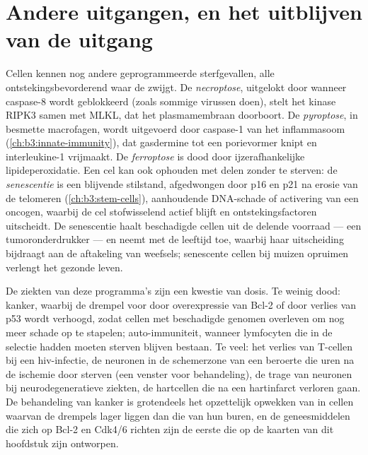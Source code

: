 \section{Andere uitgangen, en het uitblijven van de uitgang}

\begin{definition}\label{def:b3:cell-cycle-apoptosis:other}
Cellen kennen nog andere geprogrammeerde sterfgevallen, alle
ontstekingsbevorderend waar de  zwijgt. De \emph{necroptose},
uitgelokt door  wanneer caspase-8 wordt geblokkeerd
(zoals sommige virussen doen), stelt het kinase RIPK3 samen met MLKL,
dat het plasmamembraan doorboort. De \emph{pyroptose}, in besmette
macrofagen, wordt uitgevoerd door caspase-1 van het inflammasoom
(\cref{ch:b3:innate-immunity}), dat gasdermine tot een porievormer
knipt en interleukine-1 vrijmaakt. De \emph{ferroptose} is dood door
ijzerafhankelijke lipideperoxidatie. Een cel kan ook ophouden met delen
zonder te sterven: de \emph{senescentie} is een blijvende stilstand,
afgedwongen door p16 en p21 na erosie van de telomeren
(\cref{ch:b3:stem-cells}), aanhoudende DNA-schade of activering van een
oncogen, waarbij de cel stofwisselend actief blijft en
ontstekingsfactoren uitscheidt. De senescentie haalt beschadigde
cellen uit de delende voorraad --- een tumoronderdrukker --- en neemt
met de leeftijd toe, waarbij haar uitscheiding bijdraagt aan de
aftakeling van weefsels; senescente cellen bij muizen opruimen verlengt
het gezonde leven.
\end{definition}

\begin{remark}\label{rem:b3:cell-cycle-apoptosis:disease}
De ziekten van deze programma's zijn een kwestie van dosis. Te weinig
dood: kanker, waarbij de drempel voor  door overexpressie van
Bcl-2 of door verlies van p53 wordt verhoogd, zodat cellen met
beschadigde genomen overleven om nog meer schade op te stapelen;
auto-immuniteit, wanneer lymfocyten die in de selectie hadden moeten
sterven blijven bestaan. Te veel: het verlies van T-cellen bij een
hiv-infectie, de neuronen in de schemerzone van een beroerte die uren
na de ischemie door  sterven (een venster voor behandeling), de
trage  van neuronen bij neurodegeneratieve ziekten, de
hartcellen die na een hartinfarct verloren gaan. De behandeling van
kanker is grotendeels het opzettelijk opwekken van  in cellen
waarvan de drempels lager liggen dan die van hun buren, en de
geneesmiddelen die zich op Bcl-2 en Cdk4/6 richten zijn de eerste die
op de kaarten van dit hoofdstuk zijn ontworpen.
\end{remark}


